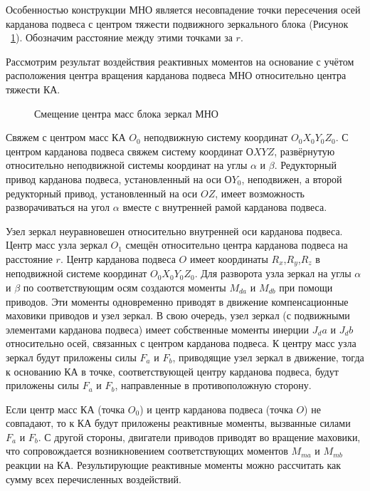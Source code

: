 Особенностью конструкции МНО является несовпадение точки пересечения осей карданова подвеса с центром тяжести подвижного зеркального блока (Рисунок ~\cref{fig:tikz_YPK}).
Обозначим расстояние между этими точками за $r$. 

Рассмотрим результат воздействия реактивных моментов на основание с учётом расположения центра вращения карданова подвеса МНО относительно центра тяжести КА.
\begin{figure}[ht]
	\legend{}
	\caption[Пример \texttt{tikz} схемы]{Смещение центра масс блока зеркал МНО}\label{fig:tikz_YPK}
\end{figure}

	Свяжем с центром масс КА $O_0$  неподвижную систему координат $O_0X_0Y_0Z_0$. С центром карданова подвеса свяжем систему координат $ОXYZ$, развёрнутую относительно неподвижной системы координат на углы $\alpha$ и $\beta$. Редукторный привод карданова подвеса, установленный на оси $ОY_0$, неподвижен, а второй редукторный привод, установленный на оси $OZ$, имеет возможность разворачиваться на угол $\alpha$ вместе с внутренней рамой карданова подвеса. 

Узел зеркал неуравновешен относительно внутренней оси карданова подвеса. Центр масс узла зеркал $O_1$ смещён относительно центра карданова подвеса на расстояние $r$. Центр карданова подвеса $O$ имеет координаты $R_x$,$R_y$,$R_z$ в неподвижной системе координат $O_0X_0Y_0Z_0$. Для разворота узла зеркал на углы $\alpha$ и $\beta$ по соответствующим осям создаются моменты $M_{da}$ и $M_{db}$ при помощи приводов. Эти моменты одновременно приводят в движение компенсационные маховики приводов и узел зеркал. В свою очередь, узел зеркал (с подвижными элементами карданова подвеса) имеет собственные моменты инерции $J_da$ и $J_db$ относительно осей, связанных с центром карданова подвеса. К центру масс узла зеркал будут приложены силы $F_a$ и $F_b$, приводящие узел зеркал в движение, тогда к основанию КА в точке, соответствующей центру карданова подвеса, будут приложены силы $F_a$ и $F_b$, направленные в противоположную сторону.

Если центр масс КА (точка $O_0$) и центр карданова подвеса (точка $O$) не совпадают, то к КА будут приложены реактивные моменты, вызванные силами $F_a$ и $F_b$. С другой стороны, двигатели приводов приводят во вращение маховики, что сопровождается возникновением  соответствующих моментов $M_{ma}$ и $M_{mb}$ реакции на КА. Результирующие реактивные моменты можно рассчитать как сумму всех перечисленных воздействий.

